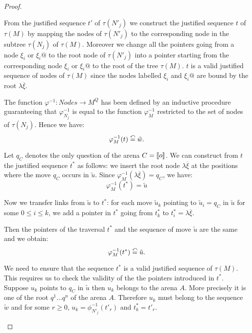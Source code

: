 \begin{proof}
\begin{itemize}
    From the justified sequence $t'$ of $\tau(N'_j)$ we construct the justified sequence $t$ of
    $\tau(M)$ by mapping the nodes of $\tau(N'_j)$ to the corresponding node in the subtree $\tau(N_j)$
    of $\tau(M)$. Moreover we change all the pointers going from a node $\xi_i$ or $\xi_i @$ to the root node of $\tau(N'_j)$
    into a pointer starting from the corresponding node $\xi_i$ or $\xi_i @$ to the root of the tree $\tau(M)$.
    $t$ is a valid justified sequence of nodes of $\tau(M)$ since the nodes labelled $\xi_i$ and $\xi_i @$
    are bound by the root $\lambda \overline{\xi}$.

    The function $\varphi^{-1} : Nodes \rightarrow M^Q$ has been defined by an inductive procedure
    guaranteeing that $\varphi^{-1}_{N_j}$ is equal to the function $\varphi^{-1}_{M}$ restricted to
    the set of nodes of $\tau(N_j)$. Hence we have:
    \begin{equation}
    \varphi^{-1}_{M}(t) \stackrel{\curvearrowleft}{=} \tilde{w}. \label{eq:def_t}
    \end{equation}

    Let $q_C$ denotes the only question of the arena $C = {[\![ o ]\!]}$.
    We can construct from $t$ the justified sequence $t^\ast$ as follows:
    we insert the root node $\lambda \overline{\xi}$ at the positions where the move $q_C$ occurs in $\tilde{u}$.
    Since $\varphi^{-1}_{M}(\lambda \overline{\xi}) = q_C$, we have:
    $$\varphi^{-1}_{M}(t^\ast) = \tilde{u}$$

    Now we transfer links from $\tilde{u}$ to $t^\ast$: for each
    move $\tilde{u}_k$ pointing to $\tilde{u}_i = q_C$ in $\tilde{u}$ for some $0 \leq i \leq k$,
    we add a pointer in $t^\ast$ going from $t^\ast_k$ to $t^\ast_i = \lambda \overline{\xi}$.

    Then the pointers of the traversal $t^\ast$ and the sequence of move $\tilde{u}$ are the same and we obtain:
    \begin{equation}
    \varphi^{-1}_{M}(t^\ast) \stackrel{\curvearrowleft}{=} \tilde{u}. \label{eq:def_tstar}
    \end{equation}

    We need to ensure that the sequence $t^\ast$ is a valid justified sequence of $\tau(M)$.
    This requires us to check the validity of the the pointers introduced in $t^\ast$.
    Suppose $u_k$ points to $q_C$ in $\tilde{u}$ then $u_k$ belongs to the arena $A$. More precisely it is one
    of the root $q^1 \ldots q^n$ of the arena $A$. Therefore $u_k$ must belong to the sequence $\tilde{w}$ and
    for some $r \geq 0$, $u_k = \phi^{-1}_{N'_j}(t'_r)$ and $t^\ast_k = t'_r$.


\end{itemize}
\end{proof}
